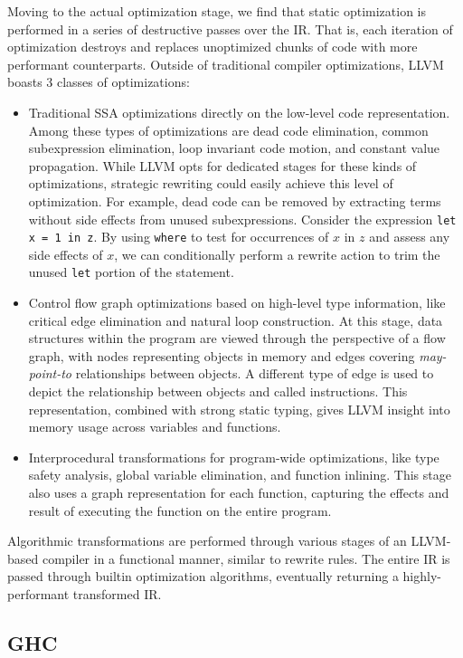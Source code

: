 \documentclass{article}
\begin{document}
Moving to the actual optimization stage, we find that static optimization is performed in a series of destructive passes over the IR. That is, each iteration of optimization destroys and replaces unoptimized chunks of code with more performant counterparts. Outside of traditional compiler optimizations, LLVM boasts 3 classes of optimizations:
\begin{itemize}
    \item Traditional SSA optimizations directly on the low-level code representation. Among these types of optimizations are dead code elimination, common subexpression elimination, loop invariant code motion, and constant value propagation. While LLVM opts for dedicated stages for these kinds of optimizations, strategic rewriting could easily achieve this level of optimization. For example, dead code can be removed by extracting terms without side effects from unused subexpressions. Consider the expression \texttt{let x = 1 in z}. By using \texttt{where} to test for occurrences of $x$ in $z$ and assess any side effects of $x$, we can conditionally perform a rewrite action to trim the unused \texttt{let} portion of the statement.
    \item Control flow graph optimizations based on high-level type information, like critical edge elimination and natural loop construction. At this stage, data structures within the program are viewed through the perspective of a flow graph, with nodes representing objects in memory and edges covering \textit{may-point-to} relationships between objects. A different type of edge is used to depict the relationship between objects and called instructions. This representation, combined with strong static typing, gives LLVM insight into memory usage across variables and functions.
    \item Interprocedural transformations for program-wide optimizations, like type safety analysis, global variable elimination, and function inlining. This stage also uses a graph representation for each function, capturing the effects and result of executing the function on the entire program.
\end{itemize}
Algorithmic transformations are performed through various stages of an LLVM-based compiler in a functional manner, similar to rewrite rules. The entire IR is passed through builtin optimization algorithms, eventually returning a highly-performant transformed IR.

\subsection{GHC}
\end{document}
